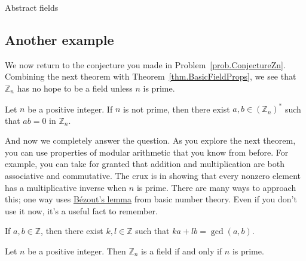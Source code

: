 \begin{section}{Abstract fields}
\subsection{Another example}
We now return to the conjecture you made in Problem~\ref{prob.ConjectureZn}. Combining the next theorem with Theorem~\ref{thm.BasicFieldProps}, we see that $\mathbb{Z}_n$ has no hope to be a field unless $n$ is prime.

\begin{theorem}
Let $n$ be a positive integer. If $n$ is not prime, then there exist $a,b\in (\mathbb{Z}_n)^*$ such that $ab=0$ in $\mathbb{Z}_n$.
\end{theorem}

And now we completely answer the question. As you explore the next theorem, you can use properties of modular arithmetic that you know from before. For example, you can take for granted that addition and multiplication are both associative and commutative. The crux is in showing that every nonzero element has a multiplicative inverse when $n$ is prime. There are many ways to approach this; one way uses \href{https://en.wikipedia.org/wiki/Bezout\%27s_identity}{B\'ezout's lemma} from basic number theory. Even if you don't use it now, it's a  useful fact to remember.

\begin{fact}
If $a,b\in \mathbb{Z}$, then there exist $k,l\in \mathbb{Z}$ such that $ka+lb = \gcd(a,b)$.
\end{fact}

\begin{theorem}\label{thm.ZpField}
Let $n$ be a positive integer. Then $\mathbb{Z}_n$ is a field if and only if $n$ is prime.
\end{theorem}
\end{section}

